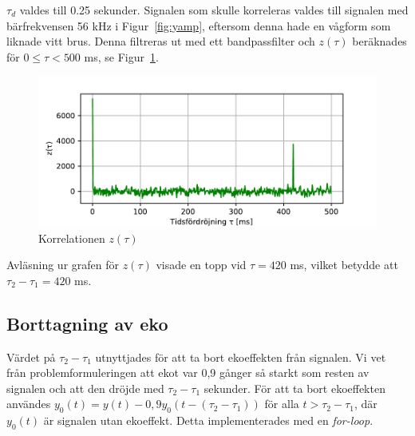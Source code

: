 \documentclass[10pt,twocolumn]{article}
\begin{document}
$\tau_d$ valdes till 0.25 sekunder. Signalen som skulle korreleras valdes till
signalen med bärfrekvensen 56 kHz i Figur~\ref{fig:yamp}, eftersom denna hade
en vågform som liknade vitt brus. Denna filtreras ut med ett bandpassfilter och
$z(\tau)$ beräknades för $0 \leq \tau < 500$ ms, se Figur~\ref{fig:corr}.

\begin{figure}[h]
    \centering
    \includegraphics[width=\linewidth]{figures/corr.pdf}
    \caption{Korrelationen $z(\tau)$}\label{fig:corr}
\end{figure}

Avläsning ur grafen för $z(\tau)$ visade en topp vid $\tau = 420$ ms, vilket
betydde att $\tau_2 - \tau_1 = 420$ ms.

\subsection{Borttagning av eko}\label{sub:echo}
Värdet på $\tau_2 - \tau_1$ utnyttjades för att ta bort ekoeffekten från signalen. Vi
vet från problemformuleringen att ekot var 0,9 gånger så starkt som resten av signalen 
och att den dröjde med $\tau_2 - \tau_1$ sekunder. För att ta bort ekoeffekten
användes $y_0(t) = y(t) - 0,9y_0(t - (\tau_2 - \tau_1))$ för alla $t > \tau_2
- \tau_1$, där $y_0(t)$ är signalen
utan ekoeffekt. Detta implementerades med en \textit{for-loop}.


% 
\end{document}
